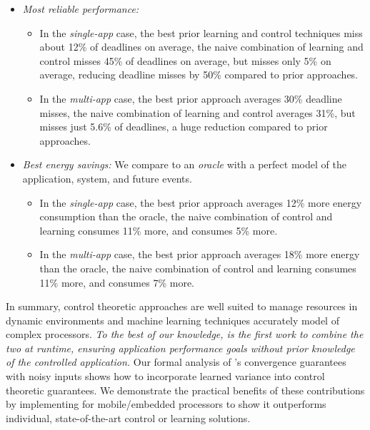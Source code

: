 \begin{itemize} 
\item \textit{Most reliable performance:} 
 \begin{itemize} 
 \item In the \emph{single-app} case, the best prior learning and
   control techniques miss about 12\% of deadlines on average, the
   naive combination of learning and control misses 45\% of deadlines
   on average, but \SYSTEM{} misses only 5\% on average, reducing
   deadline misses by 50\% compared to prior approaches.
 \item In the \emph{multi-app} case, the best prior approach averages
   30\% deadline misses, the naive combination of learning and control
   averages 31\%, but \SYSTEM{} misses just 5.6\% of deadlines, a huge
   reduction compared to prior approaches.
\end{itemize}
  \item \textit{Best energy savings:} We compare to an \emph{oracle}
    with a perfect model of the application, system, and future
    events.
    \begin{itemize}
    \item In the \emph{single-app} case, the best prior approach
      averages 12\% more energy consumption than the oracle, the naive
      combination of control and learning consumes 11\% more, and
      \SYSTEM{} consumes 5\% more.  
    \item In the \emph{multi-app} case, the best prior approach
      averages 18\% more energy than the oracle, the naive combination
      of control and learning consumes 11\% more, and \SYSTEM{}
      consumes 7\% more.
    \end{itemize}
\end{itemize}

In summary, control theoretic approaches are well suited to manage
resources in dynamic environments and machine learning techniques
accurately model of complex processors.  \emph{To the best of our
  knowledge, \SYSTEM{} is the first work to combine the two at
  runtime, ensuring application performance goals without prior
  knowledge of the controlled application.}  Our formal analysis of
\SYSTEM{}'s convergence guarantees with noisy inputs shows how to
incorporate learned variance into control theoretic guarantees.  We
demonstrate the practical benefits of these contributions by
implementing \SYTSEM{} for mobile/embedded processors to show it
outperforms individual, state-of-the-art control or learning
solutions.


